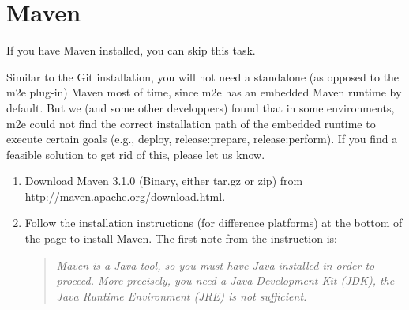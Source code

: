 
\section{Maven}

If you have Maven installed, you can skip this task.

Similar to the Git installation, you will not need a standalone (as opposed to
the m2e plug-in) Maven most of time, since m2e has an embedded Maven runtime by
default. But we (and some other developpers) found that in some environments,
m2e could not find the correct installation path of the embedded runtime to
execute certain goals (e.g., deploy, release:prepare, release:perform). If you
find a feasible solution to get rid of this, please let us know.

\begin{enumerate}

\item Download Maven 3.1.0 (Binary, either tar.gz or zip) from
\url{http://maven.apache.org/download.html}.

\item Follow the installation instructions (for difference platforms) at the
bottom of the page to install Maven. The first note from the instruction is:

\begin{quote}
\emph{Maven is a Java tool, so you must have Java installed in order to
proceed. More precisely, you need a Java Development Kit (JDK), the Java
Runtime Environment (JRE) is not sufficient.}
\end{quote}
\end{enumerate}